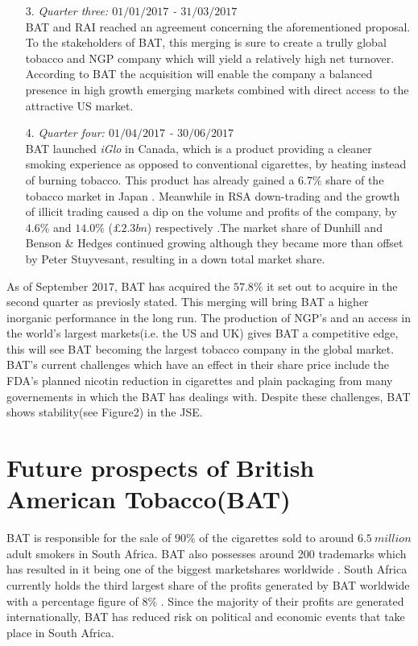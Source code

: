 \documentclass[letterpaper, 10 pt, conference]{ieeeconf}  %
\begin{document}
\begin{enumerate}
 		\item[3.]\textit{Quarter three: $01/01/2017$ - $31/03/2017$}
 		\\
 		BAT and RAI reached an agreement concerning the aforementioned proposal. To the stakeholders of BAT, this merging is sure to create a trully global tobacco and NGP company which will yield a relatively high net turnover. According to BAT the acquisition will enable the company a balanced presence in high growth emerging markets combined with direct access to the attractive US market. 
 		
 		\item[4.]\textit{Quarter four: $01/04/2017$ - $30/06/2017$}
 		\\
 		BAT launched \textit{iGlo} in Canada, which is a product providing a cleaner smoking experience as opposed to conventional cigarettes, by heating instead of burning tobacco. This product has already gained a $6.7\%$ share of the tobacco market in Japan \cite{BAT_nextgen}. Meanwhile in RSA down-trading and the growth of illicit trading caused a dip on the volume and profits of the company, by $4.6\%$ and $14.0\%$ ($\pounds2.3bn$) respectively \cite{Board_Appointment} \cite{BusinessLives}.The market share of Dunhill and Benson \& Hedges continued growing although they became more than offset by Peter Stuyvesant, resulting in a down total market share\cite{Board_Appointment}.

 		

 	\end{enumerate}	

 	As of September $2017$,  BAT has acquired the $57.8\%$ it set out to acquire in the second quarter as previosly stated. This merging will bring BAT a higher inorganic performance in the long run. The production of NGP's and an access in the world's largest markets(i.e. the US and UK) gives BAT a competitive edge, this will see BAT becoming the largest tobacco company in the global market. BAT's current challenges which have an effect in their share price include the FDA's planned nicotin reduction in cigarettes and plain packaging from many governements in which the BAT has dealings with. Despite these challenges, BAT shows stability(see Figure2) in the JSE.


\section{Future prospects of British American Tobacco(BAT)}
BAT is responsible for the sale of $90\%$ of the cigarettes sold to around $6.5~million$ adult smokers in South Africa. BAT also possesses around 200 trademarks which has resulted in it being one of the biggest marketshares worldwide \cite{BAT_hist}. South Africa currently holds the third largest share of the profits generated by BAT worldwide with a percentage figure of $8\%$ \cite{BAT_hist}. Since the majority of their profits are generated internationally, BAT has reduced risk on political and economic events that take place in South Africa.
\end{document}
